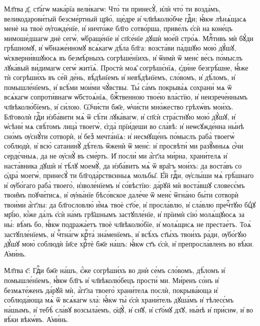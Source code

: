 \documentclass[20pt]{extarticle}
\begin{document}
Мл҃тва д҃, ст҃а́гѡ мака́рїа вели́кагѡ:
Что́ ти принесꙋ̀, и҆лѝ что́ ти возда́мъ, великодарови́тый безсме́ртный цр҃ю̀, ще́дре и҆ чл҃вѣколю́бче гдⷭ҇и; ꙗ҆́кѡ лѣнѧ́щасѧ менѐ на твоѐ ѹ҆гожде́нїе, и҆ ничто́же бл҃го сотво́рша, приве́лъ є҆сѝ на коне́цъ мимоше́дшагѡ днѐ сегѡ̀, ѡ҆браще́нїе и҆ сп҃се́нїе дꙋшѝ мое́й стро́ѧ. Млⷭ҇тивъ мѝ бꙋ́ди грѣ́шномꙋ, и҆ ѡ҆бнаже́нномꙋ всѧ́кагѡ дѣ́ла бл҃га: возста́ви па́дшꙋю мою̀ дꙋ́шꙋ, ѡ҆скверни́вшꙋюсѧ въ безмѣ́рныхъ согрѣше́нїихъ, и҆ ѿимѝ ѿ менє̀ ве́сь по́мыслъ лꙋка́вый ви́димагѡ сегѡ̀ житїѧ̀. Простѝ моѧ̑ согрѣшє́нїѧ, є҆ди́не безгрѣ́шне, ꙗ҆́же тѝ согрѣши́хъ въ се́й де́нь, вѣ́дѣнїемъ и҆ невѣ́дѣнїемъ, сло́вомъ, и҆ дѣ́ломъ, и҆ помышле́нїемъ, и҆ всѣ́ми мои́ми чꙋ́вствы. Ты̀ са́мъ покрыва́ѧ сохрани́ мѧ ѿ всѧ́кагѡ сопроти́внагѡ ѡ҆бстоѧ́нїѧ, бжⷭ҇твенною твое́ю вла́стїю, и҆ неизрече́ннымъ чл҃вѣколю́бїемъ, и҆ си́лою. Ѡ҆чи́сти бж҃е, ѡ҆чи́сти мно́жество грѣхѡ́въ мои́хъ. Бл҃говолѝ гдⷭ҇и и҆зба́вити мѧ̀ ѿ сѣ́ти лꙋка́вагѡ, и҆ сп҃сѝ стра́стнꙋю мою̀ дꙋ́шꙋ, и҆ ѡ҆сѣни́ мѧ свѣ́томъ лица̀ твоегѡ̀, є҆гда̀ прїи́деши во сла́вѣ: и҆ неѡсꙋжде́нна ны́нѣ сно́мъ ѹ҆снꙋ́ти сотворѝ, и҆ без꙽ мечта́нїѧ: и҆ несмꙋще́нъ по́мыслъ раба̀ твоегѡ̀ соблюдѝ, и҆ всю̀ сатанинꙋ̀ дѣ́тель ѿженѝ ѿ менє̀: и҆ просвѣти́ ми разꙋ̑мныѧ ѻ҆́чи сердє́чныѧ, да не ѹ҆снꙋ̀ въ сме́рть. И҆ посли́ ми а҆́гг҃ла ми́рна, храни́телѧ и҆ наста́вника дꙋшѝ и҆ тѣ́лꙋ моемꙋ̀, да и҆зба́витъ мѧ̀ ѿ вра̑гъ мои́хъ: да воста́въ со ѻ҆дра̀ моегѡ̀, принесꙋ́ ти бл҃года́рствєнныѧ мольбы̑. Е҆́й гдⷭ҇и, ѹ҆слы́ши мѧ̀ грѣ́шнаго и҆ ѹ҆бо́гаго раба̀ твоего̀, и҆зволе́нїемъ и҆ со́вѣстїю: да́рꙋй мѝ воста́вшꙋ словесє́мъ твои̑мъ поꙋчи́тисѧ, и҆ ѹ҆ны́нїе бѣсо́вское дале́че ѿ менє̀ ѿгна́но бы́ти сотворѝ твои́ми а҆́гг҃лы: да бл҃гословлю̀ и҆́мѧ твоѐ ст҃о́е, и҆ просла́влю, и҆ сла́влю пречⷭ҇тꙋю бцⷣꙋ мр҃і́ю, ю҆́же да́лъ є҆сѝ на́мъ грѣ̑шнымъ застꙋпле́нїе, и҆ прїимѝ сїю̀ молѧ́щꙋюсѧ за ны̀: вѣ́мъ бо, ꙗ҆́кѡ подража́етъ твоѐ чл҃вѣколю́бїе, и҆ молѧ́щисѧ не престае́тъ. Тоѧ̀ застꙋпле́нїемъ, и҆ чⷭ҇тна́гѡ крⷭ҇та̀ зна́менїемъ, и҆ всѣ́хъ ст҃ы́хъ твои́хъ ра́ди, ѹ҆бо́гꙋю дꙋ́шꙋ мою̀ соблюдѝ і҆и҃се хрⷭ҇тѐ бж҃е на́шъ: ꙗ҆́кѡ ст҃ъ є҆сѝ, и҆ препросла́вленъ во вѣ́ки. А҆ми́нь.

Мл҃тва є҃:
Гдⷭ҇и бж҃е на́шъ, є҆́же согрѣши́хъ во днѝ се́мъ сло́вомъ, дѣ́ломъ и҆ помышле́нїемъ, ꙗ҆́кѡ бл҃гъ и҆ чл҃вѣколю́бецъ прости́ ми. Ми́ренъ со́нъ и҆ безмѧте́женъ да́рꙋй мѝ, а҆́гг҃ла твоего̀ храни́телѧ послѝ, покрыва́юща и҆ соблюда́юща мѧ̀ ѿ всѧ́кагѡ ѕла̀: ꙗ҆́кѡ ты̀ є҆сѝ храни́тель дꙋша́мъ и҆ тѣлесє́мъ на́шымъ, и҆ тебѣ̀ сла́вꙋ возсыла́емъ, ѻ҆ц҃ꙋ̀, и҆ сн҃ꙋ, и҆ ст҃о́мꙋ дх҃ꙋ, ны́нѣ и҆ при́снѡ, и҆ во вѣ́ки вѣкѡ́въ. А҆ми́нь.
\end{document}
